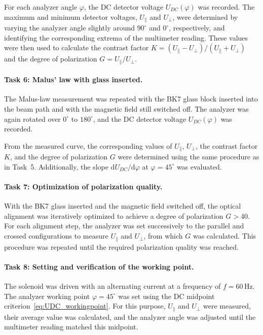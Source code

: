 \documentclass[a4paper]{article}
\begin{document}
For each analyzer angle $\varphi$, the DC detector voltage $U_{DC}(\varphi)$ was recorded.
The maximum and minimum detector voltages, $U_{\parallel}$ and $U_{\perp}$, were determined by varying the analyzer angle slightly around $90^\circ$ and $0^\circ$, respectively, and identifying the corresponding extrema of the multimeter reading.
These values were then used to calculate the contrast factor $K = (U_{\parallel} - U_{\perp}) / (U_{\parallel} + U_{\perp})$ and the degree of polarization $G = U_{\parallel} / U_{\perp}$.

\paragraph{\textbf{Task 6: Malus' law with glass inserted.}}
The Malus-law measurement was repeated with the BK7 glass block inserted into the beam path and with the magnetic field still switched off.
The analyzer was again rotated over $0^\circ$ to $180^\circ$, and the DC detector voltage $U_{DC}(\varphi)$ was recorded.

From the measured curve, the corresponding values of $U_{\parallel}$, $U_{\perp}$, the contrast factor $K$, and the degree of polarization $G$ were determined using the same procedure as in Task~5.
Additionally, the slope $\mathrm{d}U_{DC}/\mathrm{d}\varphi$ at $\varphi = 45^\circ$ was evaluated.

\paragraph{\textbf{Task 7: Optimization of polarization quality.}}
With the BK7 glass inserted and the magnetic field switched off, the optical alignment was iteratively optimized to achieve a degree of polarization $G > 40$.
For each alignment step, the analyzer was set successively to the parallel and crossed configurations to measure $U_{\parallel}$ and $U_{\perp}$, from which $G$ was calculated.
This procedure was repeated until the required polarization quality was reached.

\paragraph{\textbf{Task 8: Setting and verification of the working point.}}
The solenoid was driven with an alternating current at a frequency of $f = 60\,\mathrm{Hz}$.
The analyzer working point $\varphi = 45^\circ$ was set using the DC midpoint criterion~\eqref{eq:UDC_workingpoint}.
For this purpose, $U_{\parallel}$ and $U_{\perp}$ were measured, their average value was calculated, and the analyzer angle was adjusted until the multimeter reading matched this midpoint.
\end{document}
